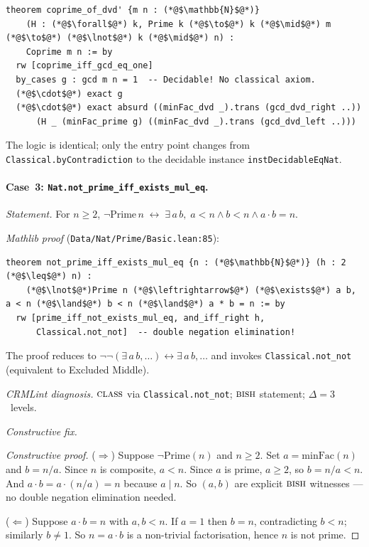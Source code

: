 \documentclass[12pt, a4paper]{article}
\theoremstyle{plain}
\theoremstyle{definition}
\theoremstyle{remark}
\newcommand{\BISH}{\textsc{bish}}
\newcommand{\CLASS}{\textsc{class}}
\begin{document}
\begin{lstlisting}
theorem coprime_of_dvd' {m n : (*@$\mathbb{N}$@*)}
    (H : (*@$\forall$@*) k, Prime k (*@$\to$@*) k (*@$\mid$@*) m (*@$\to$@*) (*@$\lnot$@*) k (*@$\mid$@*) n) :
    Coprime m n := by
  rw [coprime_iff_gcd_eq_one]
  by_cases g : gcd m n = 1  -- Decidable! No classical axiom.
  (*@$\cdot$@*) exact g
  (*@$\cdot$@*) exact absurd ((minFac_dvd _).trans (gcd_dvd_right ..))
      (H _ (minFac_prime g) ((minFac_dvd _).trans (gcd_dvd_left ..)))
\end{lstlisting}

The logic is identical; only the entry point changes from
\texttt{Classical.byContradiction} to the decidable instance
\texttt{instDecidableEqNat}.

\paragraph{Case~3: \texttt{Nat.not\_prime\_iff\_exists\_mul\_eq}.}
\emph{Statement.}  For $n \geq 2$,
$\lnot\mathrm{Prime}\,n \;\leftrightarrow\;
\exists\,a\,b,\; a < n \land b < n \land a \cdot b = n$.

\emph{Mathlib proof} (\texttt{Data/Nat/Prime/Basic.lean:85}):

\begin{lstlisting}
theorem not_prime_iff_exists_mul_eq {n : (*@$\mathbb{N}$@*)} (h : 2 (*@$\leq$@*) n) :
    (*@$\lnot$@*)Prime n (*@$\leftrightarrow$@*) (*@$\exists$@*) a b, a < n (*@$\land$@*) b < n (*@$\land$@*) a * b = n := by
  rw [prime_iff_not_exists_mul_eq, and_iff_right h,
      Classical.not_not]  -- double negation elimination!
\end{lstlisting}

The proof reduces to $\lnot\lnot(\exists\,a\,b,\ldots)
\leftrightarrow \exists\,a\,b,\ldots$ and invokes
\texttt{Classical.not\_not} (equivalent to Excluded Middle).

\emph{CRMLint diagnosis.}  $\CLASS$ via \texttt{Classical.not\_not};
$\BISH$ statement; $\Delta = 3$~levels.

\emph{Constructive fix.}

\begin{proof}[Constructive proof]
($\Rightarrow$) Suppose $\lnot\mathrm{Prime}(n)$ and $n \geq 2$.
Set $a = \mathrm{minFac}(n)$ and $b = n / a$.  Since $n$ is composite,
$a < n$.  Since $a$ is prime, $a \geq 2$, so $b = n/a < n$.  And
$a \cdot b = a \cdot (n/a) = n$ because $a \mid n$.  So $(a, b)$ are
explicit $\BISH$ witnesses --- no double negation elimination needed.

($\Leftarrow$) Suppose $a \cdot b = n$ with $a, b < n$.  If $a = 1$
then $b = n$, contradicting $b < n$; similarly $b \neq 1$.  So
$n = a \cdot b$ is a non-trivial factorisation, hence $n$ is not prime.
\end{proof}
\end{document}
